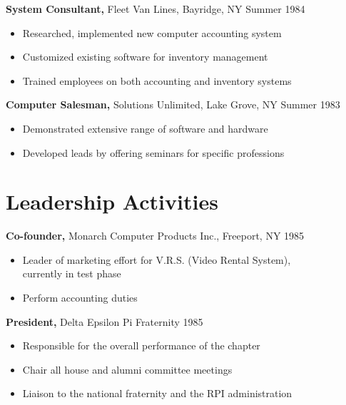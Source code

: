 \documentclass{res}
\begin{document}
\begin{resume}
{\bf System Consultant,} Fleet Van Lines, Bayridge, NY \hfill  Summer 1984
\begin{itemize} \itemsep -2pt %
\item Researched, implemented new computer accounting
                 system
\item Customized existing software for inventory
                 management
\item Trained employees on both accounting and inventory
                 systems
\end{itemize}

{\bf Computer Salesman,} Solutions Unlimited, Lake Grove, NY \hfill
Summer 1983
                \begin{itemize} \itemsep -2pt
                 \item  Demonstrated extensive range of software and
                 hardware

                 \item Developed leads by offering seminars for specific
                 professions

		 \end{itemize}

\section{Leadership   Activities}
               {\bf Co-founder,} Monarch Computer Products Inc., Freeport, NY    \hfill         1985
                \begin{itemize} \itemsep -2pt
              \item Leader of marketing effort for V.R.S. (Video
                 Rental System), \\
                  currently in test phase

                \item  Perform accounting duties

		 \end{itemize}

		{\bf President,} Delta Epsilon Pi Fraternity \hfill   1985
                \begin{itemize} \itemsep -2pt
                 \item  Responsible for the overall performance of the
                 chapter

                 \item Chair all house and alumni committee meetings

                 \item Liaison to the national fraternity and the RPI
                 administration
		 \end{itemize}


\end{resume}
\end{document}
